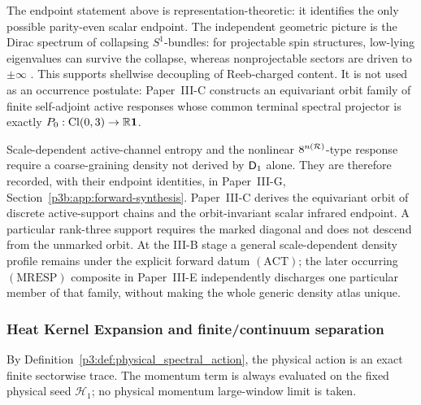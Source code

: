 \documentclass[12pt,a4paper]{article}
\begin{document}
\begin{remark}
The endpoint statement above is representation-theoretic: it identifies the
only possible parity-even scalar endpoint.  The independent geometric picture
is the Dirac spectrum of collapsing $S^1$-bundles: for projectable spin
structures, low-lying eigenvalues can survive the collapse, whereas
nonprojectable sectors are driven to $\pm\infty$ \cite{Ammann1998}.  This
supports shellwise decoupling of Reeb-charged content.  It is not used as an
occurrence postulate: Paper~III-C constructs an equivariant orbit family of
finite self-adjoint active responses whose common terminal spectral projector is exactly
\(P_0:\operatorname{Cl}(0,3)\to\mathbb{R}\mathbf1\).
\end{remark}
\begin{remark}
Scale-dependent active-channel entropy and the nonlinear
\(8^{n(\mathcal R)}\)-type response require a coarse-graining density not derived
by \(\mathsf{D}_1\) alone.  They are therefore recorded, with their endpoint
identities, in Paper~III-G, Section~\ref{p3b:app:forward-synthesis}.  Paper~III-C derives
the equivariant orbit of discrete active-support chains and the orbit-invariant
scalar infrared endpoint.  A particular rank-three support requires the
marked diagonal and does not descend from the unmarked orbit.  At the III-B
stage a general scale-dependent density profile remains under the explicit
forward datum \((\mathrm{ACT})\); the later occurring \((\mathrm{MRESP})\)
composite in Paper~III-E independently discharges one particular member of
that family, without making the whole generic density atlas unique.
\end{remark}

\subsubsection{Heat Kernel Expansion and finite/continuum separation}

By Definition~\ref{p3:def:physical_spectral_action}, the physical action is
an exact finite sectorwise trace.  The momentum term is always evaluated on
the fixed physical seed \(\mathcal H_1\); no physical momentum large-window
limit is taken.
\end{document}
